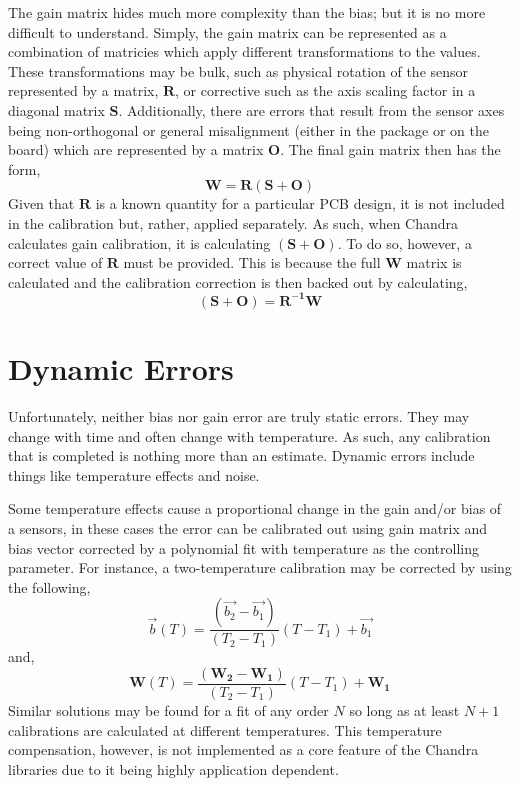 \documentclass[10pt,letterpaper]{memoir} %
\begin{document}
The gain matrix hides much more complexity than the bias; but it is no more difficult to understand.  Simply, the gain matrix can be represented as a combination of matricies which apply different transformations to the values.  These transformations may be bulk, such as physical rotation of the sensor represented by a matrix, $\mathbf{R}$, or corrective such as the axis scaling factor in a diagonal matrix $\mathbf{S}$.  Additionally, there are errors that result from the sensor axes being non-orthogonal or general misalignment (either in the package or on the board) which are represented by a matrix $\mathbf{O}$.  The final gain matrix then has the form,
\begin{equation}
	\mathbf{W} = \mathbf{R}(\mathbf{S}+\mathbf{O})
\end{equation}
Given that $\mathbf{R}$ is a known quantity for a particular PCB design, it is not included in the calibration but, rather, applied separately.  As such, when Chandra calculates gain calibration, it is calculating $(\mathbf{S}+\mathbf{O})$.  To do so, however, a correct value of $\mathbf{R}$ must be provided.  This is because the full $\mathbf{W}$ matrix is calculated and the calibration correction is then backed out by calculating,
\begin{equation}
	(\mathbf{S}+\mathbf{O}) = \mathbf{R^{-1}}\mathbf{W}
\end{equation}


\section{Dynamic Errors}
Unfortunately, neither bias nor gain error are truly static errors.  They may change with time and often change with temperature.  As such, any calibration that is completed is nothing more than an estimate.  Dynamic errors include things like temperature effects and noise.  

Some temperature effects cause a proportional change in the gain and/or bias of a sensors, in these cases the error can be calibrated out using gain matrix and bias vector corrected by a polynomial fit with temperature as the controlling parameter.  For instance, a two-temperature calibration may be corrected by using the following,
\begin{equation}
	\vec{b}(T) = \frac{(\vec{b_2}-\vec{b_1})}{(T_2-T_1)}(T - T_1) + \vec{b_1}
\end{equation} 
and,
\begin{equation}
	\mathbf{W}(T) = \frac{(\mathbf{W_2}-\mathbf{W_1})}{(T_2-T_1)}(T - T_1) + \mathbf{W_1}
\end{equation} 
Similar solutions may be found for a fit of any order $N$ so long as at least $N+1$ calibrations are calculated at different temperatures.  This temperature compensation, however, is not implemented as a core feature of the Chandra libraries due to it being highly application dependent.
\end{document}
